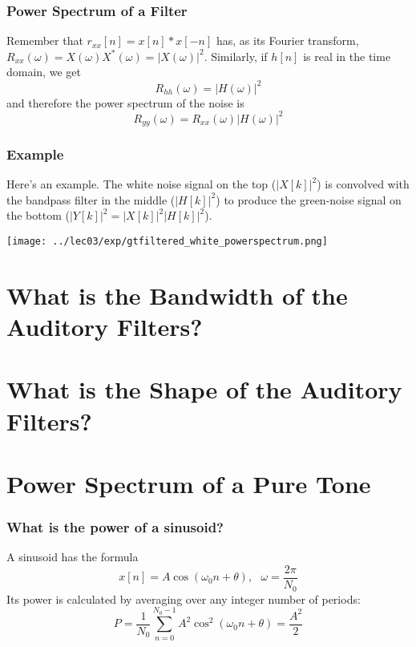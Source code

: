 \documentclass{beamer}
\begin{document}
\begin{frame}
  \frametitle{Power Spectrum of a  Filter}

  Remember that $r_{xx}[n]=x[n]\ast x[-n]$ has, as its Fourier
  transform, $R_{xx}(\omega)=X(\omega)X^*(\omega)=|X(\omega)|^2$.
  Similarly, if $h[n]$ is real in the time domain, we get
  \[
  R_{hh}(\omega)  = |H(\omega)|^2
  \]
  and therefore the power spectrum of the noise is
  \[
  R_{yy}(\omega) = R_{xx}(\omega)|H(\omega)|^2
  \]
\end{frame}

\begin{frame}
  \frametitle{Example}

  Here's an example.  The white noise signal on the top ($|X[k]|^2$) is
  convolved with the bandpass filter in the middle ($|H[k]|^2$) to produce
  the green-noise signal on the bottom ($|Y[k]|^2=|X[k]|^2|H[k]|^2$).
  
  \centerline{\texttt{[image: ../lec03/exp/gtfiltered\_white\_powerspectrum.png]}}
\end{frame}
  
\section[Bandwidth]{What is the Bandwidth of the Auditory Filters?}
\setcounter{subsection}{1}

\section[Shape]{What is the Shape of the Auditory Filters?}
\setcounter{subsection}{1}

\section[Tone]{Power Spectrum of a Pure Tone}
\setcounter{subsection}{1}

\begin{frame}
  \frametitle{What is the power of a sinusoid?}

  A sinusoid has the formula
  \[
  x[n] = A\cos\left(\omega_0 n+\theta\right),~~~\omega=\frac{2\pi}{N_0}
  \]
  Its power is calculated by averaging over any integer number of
  periods:
  \[
  P = \frac{1}{N_0}\sum_{n=0}^{N_0-1} A^2\cos^2\left(\omega_0 n+\theta\right) = \frac{A^2}{2}
  \]
\end{frame}
\end{document}
